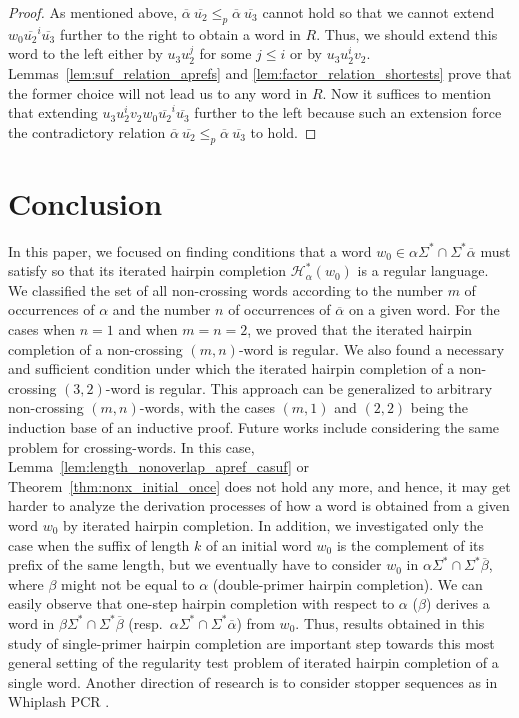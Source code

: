 \documentclass{article}
\theoremstyle{plain}
\theoremstyle{remark}
\newcommand{\HC}{\ensuremath{\mathcal{H}}}
\newcommand{\calpha}{\ensuremath{\overline{\alpha}}}
\begin{document}
\begin{proof}
	As mentioned above, $\calpha \ \overline{u_2} \le_p \calpha \ \overline{u_3}$ cannot hold so that we cannot extend $w_0 \overline{u_2}^i \overline{u_3}$ further to the right to obtain a word in $R$. 
	Thus, we should extend this word to the left either by $u_3 u_2^j$ for some $j \le i$ or by $u_3 u_2^i v_2$. 
	Lemmas~\ref{lem:suf_relation_aprefs} and \ref{lem:factor_relation_shortests} prove that the former choice will not lead us to any word in $R$. 
	Now it suffices to mention that extending $u_3 u_2^i v_2 w_0 \overline{u_2}^i \overline{u_3}$ further to the left because such an extension force the contradictory relation $\calpha \ \overline{u_2} \le_p \calpha \ \overline{u_3}$ to hold. 
\end{proof}


\section{Conclusion}

In this paper, we focused on finding conditions that a word $w_0 \in \alpha \Sigma^* \cap \Sigma^* \calpha$ must satisfy so that its iterated hairpin completion $\HC_\alpha^*(w_0)$ is a regular language. 
We classified the set of all non-crossing words according to the number $m$ of occurrences of $\alpha$ and the number $n$ of occurrences of $\calpha$ on a given word. 
For the cases when $n = 1$ and when $m = n = 2$, we proved that the iterated hairpin completion of a non-crossing $(m, n)$-word is regular. 
We also found a necessary and sufficient condition under which the iterated hairpin completion of a non-crossing $(3, 2)$-word is regular. 
This approach can be generalized to arbitrary non-crossing $(m, n)$-words, with the cases $(m, 1)$ and $(2, 2)$ being the induction base of an inductive proof. 
Future works include considering the same problem for crossing-words. 
In this case, Lemma~\ref{lem:length_nonoverlap_apref_casuf} or Theorem~\ref{thm:nonx_initial_once} does not hold any more, and hence, it may get harder to analyze the derivation processes of how a word is obtained from a given word $w_0$ by iterated hairpin completion. 
In addition, we investigated only the case when the suffix of length $k$ of an initial word $w_0$ is the complement of its prefix of the same length, but we eventually have to consider $w_0$ in $\alpha \Sigma^* \cap \Sigma^* \overline{\beta}$, where $\beta$ might not be equal to $\alpha$ (double-primer hairpin completion). 
We can easily observe that one-step hairpin completion with respect to $\alpha$ ($\beta$) derives a word in $\beta \Sigma^* \cap \Sigma^* \overline{\beta}$ (resp.~$\alpha \Sigma^* \cap \Sigma^* \calpha$) from $w_0$. 
Thus, results obtained in this study of single-primer hairpin completion are important step towards this most general setting of the regularity test problem of iterated hairpin completion of a single word. 
Another direction of research is to consider stopper sequences as in Whiplash PCR \cite{HAKSY00, SKKGYISH99}. 



	
\end{document}
